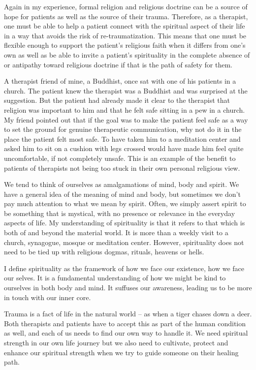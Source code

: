 \documentclass[]{book}
\begin{document}
Again in my experience, formal religion and religious doctrine can be a source of hope for patients as well as the source of their trauma. Therefore, as a therapist, one must be able to help a patient connect with the spiritual aspect of their life in a way that avoids the risk of re-traumatization. This means that one must be flexible enough to support the patient's religious faith when it differs from one's own as well as be able to invite a patient's spirituality in the complete absence of or antipathy toward religious doctrine if that is the path of safety for them.

A therapist friend of mine, a Buddhist, once sat with one of his patients in a church. The patient knew the therapist was a Buddhist and was surprised at the suggestion. But the patient had already made it clear to the therapist that religion was important to him and that he felt safe sitting in a pew in a church. My friend pointed out that if the goal was to make the patient feel safe as a way to set the ground for genuine therapeutic communication, why not do it in the place the patient felt most safe. To have taken him to a meditation center and asked him to sit on a cushion with legs crossed would have made him feel quite uncomfortable, if not completely unsafe. This is an example of the benefit to patients of therapists not being too stuck in their own personal religious view.

We tend to think of ourselves as amalgamations of mind, body and spirit. We have a general idea of the meaning of mind and body, but sometimes we don't pay much attention to what we mean by spirit. Often, we simply assert spirit to be something that is mystical, with no presence or relevance in the everyday aspects of life. My understanding of spirituality is that it refers to that which is both of and beyond the material world. It is more than a weekly visit to a church, synagogue, mosque or meditation center. However, spirituality does not need to be tied up with religious dogmas, rituals, heavens or hells.

I define spirituality as the framework of how we face our existence, how we face our selves. It is a fundamental understanding of how we might be kind to ourselves in both body and mind. It suffuses our awareness, leading us to be more in touch with our inner core.

Trauma is a fact of life in the natural world -- as when a tiger chases down a deer. Both therapists and patients have to accept this as part of the human condition as well, and each of us needs to find our own way to handle it. We need spiritual strength in our own life journey but we also need to cultivate, protect and enhance our spiritual strength when we try to guide someone on their healing path.
\end{document}
